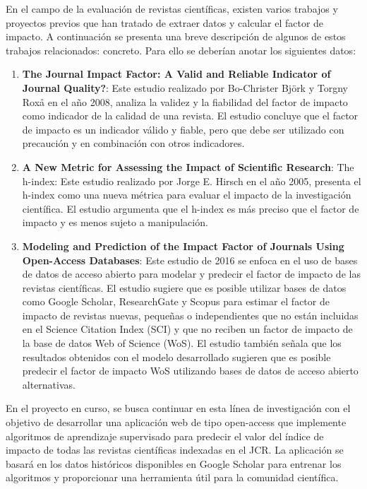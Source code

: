 
En el campo de la evaluación de revistas científicas, existen varios trabajos y proyectos previos que han tratado de extraer datos y calcular el factor de impacto. A continuación se presenta una breve descripción de algunos de estos trabajos relacionados:
concreto. Para ello se deberían anotar los siguientes datos:
\begin{enumerate}
    \item \textbf{The Journal Impact Factor: A Valid and Reliable Indicator of Journal Quality?}: Este estudio realizado por Bo-Christer Björk y Torgny Roxå en el año 2008, analiza la validez y la fiabilidad del factor de impacto como indicador de la calidad de una revista. El estudio concluye que el factor de impacto es un indicador válido y fiable, pero que debe ser utilizado con precaución y en combinación con otros indicadores.

    \item \textbf{A New Metric for Assessing the Impact of Scientific Research}: The h-index: Este estudio realizado por Jorge E. Hirsch en el año 2005, presenta el h-index como una nueva métrica para evaluar el impacto de la investigación científica. El estudio argumenta que el h-index es más preciso que el factor de impacto y es menos sujeto a manipulación.

    \item \textbf{Modeling and Prediction of the Impact Factor of Journals Using Open-Access Databases}: Este estudio de 2016 se enfoca en el uso de bases de datos de acceso abierto para modelar y predecir el factor de impacto de las revistas científicas. El estudio sugiere que es posible utilizar bases de datos como Google Scholar, ResearchGate y Scopus para estimar el factor de impacto de revistas nuevas, pequeñas o independientes que no están incluidas en el Science Citation Index (SCI) y que no reciben un factor de impacto de la base de datos Web of Science (WoS). El estudio también señala que los resultados obtenidos con el modelo desarrollado sugieren que es posible predecir el factor de impacto WoS utilizando bases de datos de acceso abierto alternativas.
\end{enumerate}

En el proyecto en curso, se busca continuar en esta línea de investigación con el objetivo de desarrollar una aplicación web de tipo open-access que implemente algoritmos de aprendizaje supervisado para predecir el valor del índice de impacto de todas las revistas científicas indexadas en el JCR. La aplicación se basará en los datos históricos disponibles en Google Scholar para entrenar los algoritmos y proporcionar una herramienta útil para la comunidad científica.
